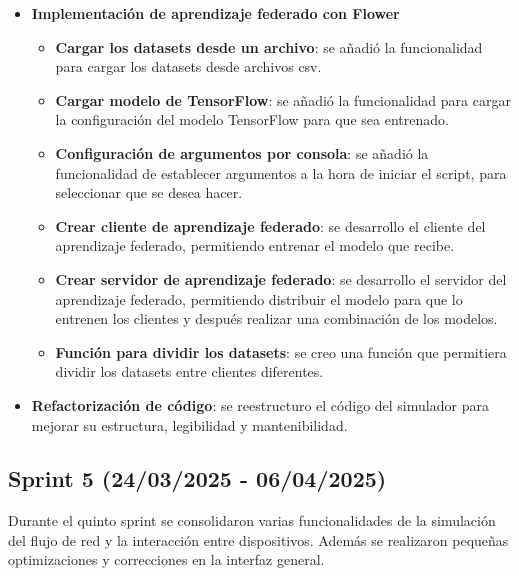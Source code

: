 \begin{itemize}
    \item \textbf{Implementación de aprendizaje federado con Flower}
    \begin{itemize}
        \item \textbf{Cargar los datasets desde un archivo}: se añadió la funcionalidad para cargar los datasets desde archivos csv.
        \item \textbf{Cargar modelo de TensorFlow}: se añadió la funcionalidad para cargar la configuración del modelo TensorFlow para que sea entrenado.
        \item \textbf{Configuración de argumentos por consola}: se añadió la funcionalidad de establecer argumentos a la hora de iniciar el script, para seleccionar que se desea hacer.
        \item \textbf{Crear cliente de aprendizaje federado}: se desarrollo el cliente del aprendizaje federado, permitiendo entrenar el modelo que recibe.
        \item \textbf{Crear servidor de aprendizaje federado}: se desarrollo el servidor del aprendizaje federado, permitiendo distribuir el modelo para que lo entrenen los clientes y después realizar una combinación de los modelos.
        \item \textbf{Función para dividir los datasets}: se creo una función que permitiera dividir los datasets entre clientes diferentes.
    \end{itemize}
    \item \textbf{Refactorización de código}: se reestructuro el código del simulador para mejorar su estructura, legibilidad y mantenibilidad.
\end{itemize}

\subsection{Sprint 5 (24/03/2025 - 06/04/2025)}
\label{subsec:QuintoSprint}
Durante el quinto sprint se consolidaron varias funcionalidades de la simulación del flujo de red y la interacción entre dispositivos. Además se realizaron pequeñas optimizaciones y correcciones en la interfaz general.


